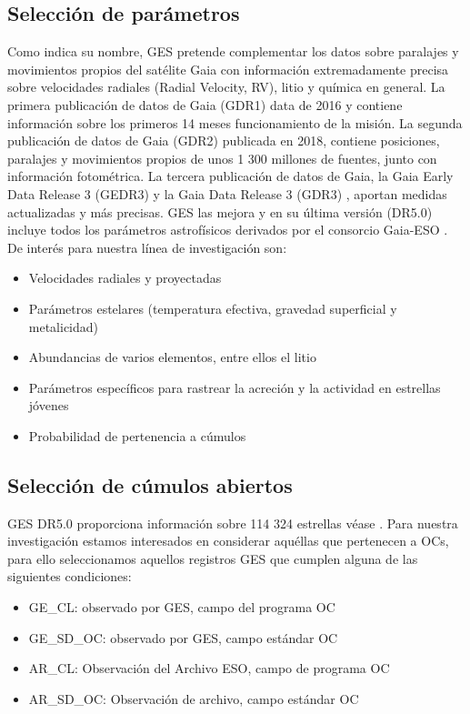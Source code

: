 \subsection{Selección de parámetros}
Como indica su nombre, GES pretende complementar los datos sobre paralajes y movimientos propios del satélite Gaia con información extremadamente precisa sobre velocidades radiales (Radial Velocity, RV), litio y química en general. La primera publicación de datos de Gaia (GDR1) \citep{Brown2016} data de 2016 y contiene información sobre los primeros 14 meses funcionamiento de la misión. La segunda publicación de datos de Gaia (GDR2) \citep{Brown2018} publicada en 2018, contiene posiciones, paralajes y movimientos propios de unos 1 300 millones de fuentes, junto con información fotométrica. La tercera publicación de datos de Gaia, la Gaia Early Data Release 3 (GEDR3) \citep{Brown2021} y la Gaia Data Release 3 (GDR3) \citep{Brown2022}, aportan medidas actualizadas y más precisas. GES las mejora y en su última versión (DR5.0) incluye todos los parámetros astrofísicos derivados por el consorcio Gaia-ESO \citep{Gilmore2022}. De interés para nuestra línea de investigación son:
\begin{itemize}
	\item Velocidades radiales y proyectadas
	\item Parámetros estelares (temperatura efectiva, gravedad superficial y metalicidad)
	\item Abundancias de varios elementos, entre ellos el litio
	\item Parámetros específicos para rastrear la acreción y la actividad en estrellas jóvenes
	\item Probabilidad de pertenencia a cúmulos
\end{itemize}


\subsection{Selección de cúmulos abiertos}
GES DR5.0 proporciona información sobre 114 324 estrellas véase \citep[véase][para más detalles]{Gilmore2022}. Para nuestra investigación estamos interesados en considerar aquéllas que pertenecen a OCs, para ello seleccionamos aquellos registros GES que cumplen alguna de las siguientes condiciones:

\begin{itemize}
	\item GE\_CL: observado por GES, campo del programa OC
	\item GE\_SD\_OC: observado por GES, campo estándar OC
	\item AR\_CL: Observación del Archivo ESO, campo de programa OC
	\item AR\_SD\_OC: Observación de archivo, campo estándar OC
\end{itemize}
	
